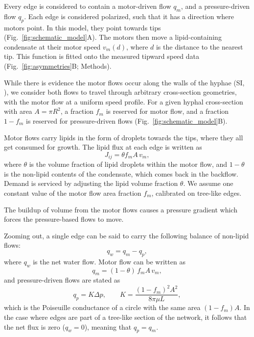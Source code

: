 Every edge is considered to contain a motor-driven flow $q_m$, and a pressure-driven flow $q_p$. Each edge is considered polarized, such that it has a direction where motors point. In this model, they point towards tips (Fig.~\ref{fig:schematic_model}A). The motors then move a lipid-containing condensate at their motor speed $v_m(d)$, where $d$ is the distance to the nearest tip. This function is fitted onto the measured tipward speed data (Fig.~\ref{fig:asymmetries}B; Methods).

While there is evidence the motor flows occur along the walls of the hyphae (SI, ), we consider both flows to travel through arbitrary cross-section geometries, with the motor flow at a uniform speed profile. For a given hyphal cross-section with area $A = \pi R^2$, a fraction $f_m$ is reserved for motor flow, and a fraction $1-f_m$ is reserved for pressure-driven flows (Fig.~\ref{fig:schematic_model}B).

Motor flows carry lipids in the form of droplets towards the tips, where they all get consumed for growth. The lipid flux at each edge is written as
\begin{equation}
\label{eq:lipid_current}
J_{ij} = \theta f_m A\, v_m,
\end{equation}
where $\theta$ is the volume fraction of lipid droplets within the motor flow, and $1-\theta$ is the non-lipid contents of the condensate, which comes back in the backflow. Demand is serviced by adjusting the lipid volume fraction $\theta$. We assume one constant value of the motor flow area fraction $f_m$, calibrated on tree-like edges.

The buildup of volume from the motor flows causes a pressure gradient which forces the pressure-based flows to move.

Zooming out, a single edge can be said to carry the following balance of non-lipid flows:
\begin{equation}
\label{eq:net_inner_flow}
q_w = q_m - q_p,
\end{equation}
where $q_w$ is the net water flow. Motor flow can be written as
\begin{equation}
\label{eq:motor_stream}
q_m = (1-\theta)\, f_m A\, v_m,
\end{equation}
and pressure-driven flows are stated as
\begin{equation}
\label{eq:core_flux}
q_p = K \Delta p, \qquad K = \frac{(1-f_m)^2 A^2}{8 \pi \mu L},
\end{equation}
which is the Poiseuille conductance of a circle with the same area $(1-f_m)A$. In the case where edges are part of a tree-like section of the network, it follows that the net flux is zero ($q_w = 0$), meaning that $q_p = q_m$.

